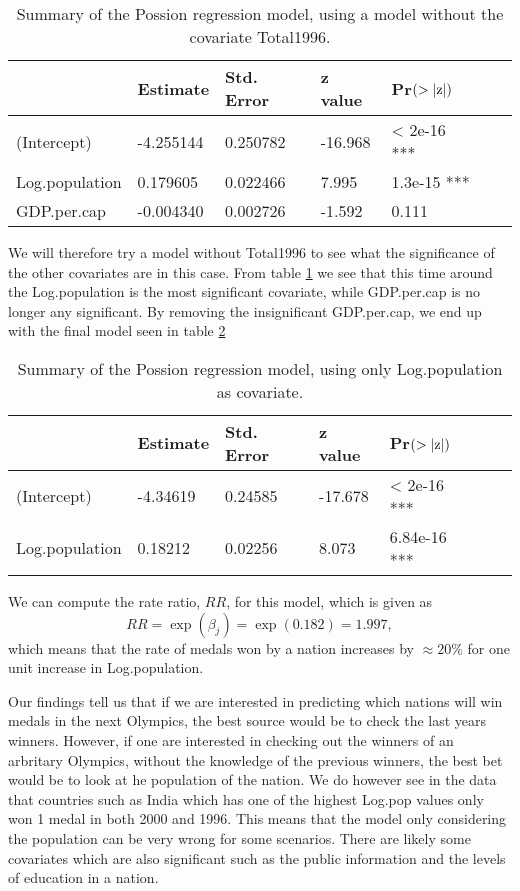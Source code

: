\documentclass[a4paper, 10pt, reqno]{amsart}
\begin{document}
\begin{table}
\caption{Summary of the Possion regression model, using a model without the covariate Total1996.}
\label{tab: 6}
\begin{tabular}{lllllll}
\hline\hline
 & Estimate  & Std. Error & z value & Pr$(>\abs{\mathrm{z}})$ & \\ \hline
(Intercept)  &  -4.255144  & 0.250782& -16.968 & < 2e-16 ***\\
Log.population & 0.179605 &  0.022466  & 7.995 & 1.3e-15 ***\\
GDP.per.cap  &  -0.004340&   0.002726 & -1.592  &  0.111  \\
\hline
\end{tabular}
\end{table}

We will therefore try a model without Total1996 to see what the significance of the other covariates are in this case. From table \ref{tab: 6} we see that this time around the Log.population is the most significant covariate, while GDP.per.cap is no longer any significant. By removing the insignificant GDP.per.cap, we end up with the final model seen in table \ref{tab: 7}

\begin{table}
\caption{Summary of the Possion regression model, using only Log.population as covariate.}
\label{tab: 7}
\begin{tabular}{lllllll}
\hline\hline
 & Estimate  & Std. Error & z value & Pr$(>\abs{\mathrm{z}})$ & \\ \hline
(Intercept) &   -4.34619  &  0.24585& -17.678 & < 2e-16 ***\\
Log.population & 0.18212 &   0.02256  & 8.073 &6.84e-16 ***\\
\hline
\end{tabular}
\end{table}

We can compute the rate ratio, $RR$, for this model, which is given as 
\begin{equation}
    RR = \exp(\beta_j) = \exp(0.182) = 1.997,
\end{equation}
which means that the rate of medals won by a nation increases by $\approx 20\%$ for one unit increase in Log.population. 


Our findings tell us that if we are interested in predicting which nations will win medals in the next Olympics, the best source would be to check the last years winners. However, if one are interested in checking out the winners of an arbritary Olympics, without the knowledge of the previous winners, the best bet would be to look at he population of the nation. We do however see in the data that countries such as India which has one of the highest Log.pop values only won 1 medal in both 2000 and 1996. This means that the model only considering the population can be very wrong for some scenarios. There are likely some covariates which are also significant such as the public information and the levels of education in a nation.
\end{document}
